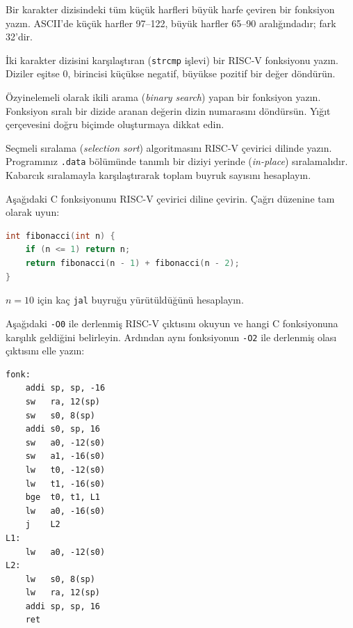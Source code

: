\begin{alistirma}[\kolay]
Bir karakter dizisindeki tüm küçük harfleri büyük harfe çeviren bir fonksiyon yazın. ASCII'de küçük harfler 97--122, büyük harfler 65--90 aralığındadır; fark 32'dir.
\end{alistirma}

\begin{alistirma}[\kolay]
İki karakter dizisini karşılaştıran (\texttt{strcmp} işlevi) bir RISC-V fonksiyonu yazın. Diziler eşitse 0, birincisi küçükse negatif, büyükse pozitif bir değer döndürün.
\end{alistirma}

\begin{alistirma}[\orta]
Özyinelemeli olarak ikili arama (\emph{binary search}) yapan bir fonksiyon yazın. Fonksiyon sıralı bir dizide aranan değerin dizin numarasını döndürsün. Yığıt çerçevesini doğru biçimde oluşturmaya dikkat edin.
\end{alistirma}

\begin{alistirma}[\orta]
Seçmeli sıralama (\emph{selection sort}) algoritmasını RISC-V çevirici dilinde yazın. Programınız \texttt{.data} bölümünde tanımlı bir diziyi yerinde (\emph{in-place}) sıralamalıdır. Kabarcık sıralamayla karşılaştırarak toplam buyruk sayısını hesaplayın.
\end{alistirma}

\begin{alistirma}[\orta]
Aşağıdaki C fonksiyonunu RISC-V çevirici diline çevirin. Çağrı düzenine tam olarak uyun:
\begin{lstlisting}[language=C, style=alistirma-kod]
int fibonacci(int n) {
    if (n <= 1) return n;
    return fibonacci(n - 1) + fibonacci(n - 2);
}
\end{lstlisting}
$n = 10$ için kaç \texttt{jal} buyruğu yürütüldüğünü hesaplayın.
\end{alistirma}

\begin{alistirma}[\orta]
Aşağıdaki \texttt{-O0} ile derlenmiş RISC-V çıktısını okuyun ve hangi C fonksiyonuna karşılık geldiğini belirleyin. Ardından aynı fonksiyonun \texttt{-O2} ile derlenmiş olası çıktısını elle yazın:
\begin{lstlisting}[style=riscv]
fonk:
    addi sp, sp, -16
    sw   ra, 12(sp)
    sw   s0, 8(sp)
    addi s0, sp, 16
    sw   a0, -12(s0)
    sw   a1, -16(s0)
    lw   t0, -12(s0)
    lw   t1, -16(s0)
    bge  t0, t1, L1
    lw   a0, -16(s0)
    j    L2
L1:
    lw   a0, -12(s0)
L2:
    lw   s0, 8(sp)
    lw   ra, 12(sp)
    addi sp, sp, 16
    ret
\end{lstlisting}
\end{alistirma}

